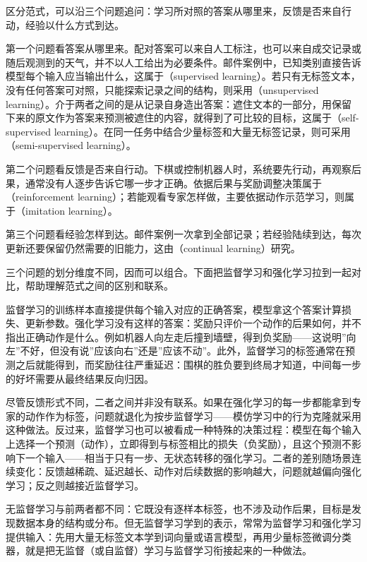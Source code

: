 区分范式，可以沿三个问题追问：学习所对照的答案从哪里来，反馈是否来自行动，经验以什么方式到达。

第一个问题看答案从哪里来。配对答案可以来自人工标注，也可以来自成交记录或随后观测到的天气，并不以人工给出为必要条件。邮件案例中，已知类别直接告诉模型每个输入应当输出什么，这属于（supervised learning）。若只有无标签文本，没有任何答案可对照，只能探索记录之间的结构，则采用（unsupervised learning）。介于两者之间的是从记录自身造出答案：遮住文本的一部分，用保留下来的原文作为答案来预测被遮住的内容，就得到了可比较的目标，这属于（self-supervised learning）。在同一任务中结合少量标签和大量无标签记录，则可采用（semi-supervised learning）。

第二个问题看反馈是否来自行动。下棋或控制机器人时，系统要先行动，再观察后果，通常没有人逐步告诉它哪一步才正确。依据后果与奖励调整决策属于（reinforcement learning）；若能观看专家怎样做，主要依据动作示范学习，则属于（imitation learning）。

第三个问题看经验怎样到达。邮件案例一次拿到全部记录；若经验陆续到达，每次更新还要保留仍然需要的旧能力，这由（continual learning）研究。

三个问题的划分维度不同，因而可以组合。下面把监督学习和强化学习拉到一起对比，帮助理解范式之间的区别和联系。

监督学习的训练样本直接提供每个输入对应的正确答案，模型拿这个答案计算损失、更新参数。强化学习没有这样的答案：奖励只评价一个动作的后果如何，并不指出正确动作是什么。例如机器人向左走后撞到墙壁，得到负奖励——这说明”向左”不好，但没有说”应该向右”还是”应该不动”。此外，监督学习的标签通常在预测之后就能得到，而奖励往往严重延迟：围棋的胜负要到终局才知道，中间每一步的好坏需要从最终结果反向归因。

尽管反馈形式不同，二者之间并非没有联系。如果在强化学习的每一步都能拿到专家的动作作为标签，问题就退化为按步监督学习——模仿学习中的行为克隆就采用这种做法。反过来，监督学习也可以被看成一种特殊的决策过程：模型在每个输入上选择一个预测（动作），立即得到与标签相比的损失（负奖励），且这个预测不影响下一个输入——相当于只有一步、无状态转移的强化学习。二者的差别随场景连续变化：反馈越稀疏、延迟越长、动作对后续数据的影响越大，问题就越偏向强化学习；反之则越接近监督学习。

无监督学习与前两者都不同：它既没有逐样本标签，也不涉及动作后果，目标是发现数据本身的结构或分布。但无监督学习学到的表示，常常为监督学习和强化学习提供输入：先用大量无标签文本学到词向量或语言模型，再用少量标签微调分类器，就是把无监督（或自监督）学习与监督学习衔接起来的一种做法。

